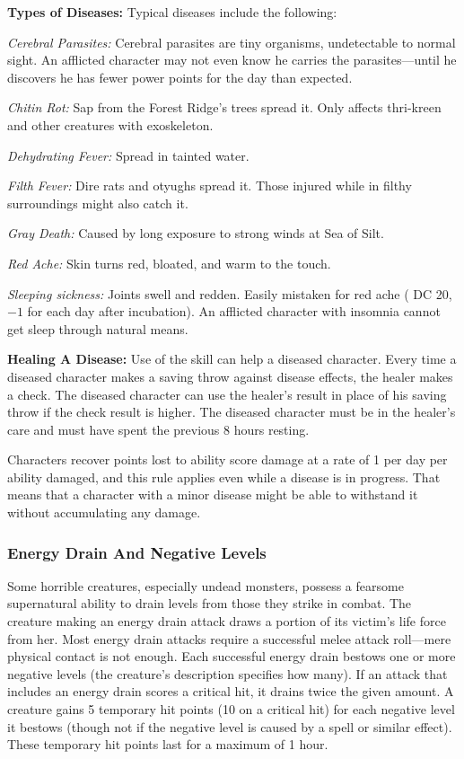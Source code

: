 \textbf{Types of Diseases:} Typical diseases include the following:

\textit{Cerebral Parasites:} Cerebral parasites are tiny organisms, undetectable to normal sight. An afflicted character may not even know he carries the parasites---until he discovers he has fewer power points for the day than expected. 

\textit{Chitin Rot:} Sap from the Forest Ridge's trees spread it. Only affects thri-kreen and other creatures with exoskeleton.

\textit{Dehydrating Fever:} Spread in tainted water.

\textit{Filth Fever:} Dire rats and otyughs spread it. Those injured while in filthy surroundings might also catch it.

\textit{Gray Death:} Caused by long exposure to strong winds at Sea of Silt.

\textit{Red Ache:} Skin turns red, bloated, and warm to the touch.

\textit{Sleeping sickness:} Joints swell and redden. Easily mistaken for red ache ( DC 20, $-1$ for each day after incubation). An afflicted character with insomnia cannot get sleep through natural means.

\textbf{Healing A Disease:} Use of the  skill can help a diseased character. Every time a diseased character makes a saving throw against disease effects, the healer makes a check. The diseased character can use the healer's result in place of his saving throw if the  check result is higher. The diseased character must be in the healer's care and must have spent the previous 8 hours resting.

Characters recover points lost to ability score damage at a rate of 1 per day per ability damaged, and this rule applies even while a disease is in progress. That means that a character with a minor disease might be able to withstand it without accumulating any damage.

\subsubsection{Energy Drain And Negative Levels}
Some horrible creatures, especially undead monsters, possess a fearsome supernatural ability to drain levels from those they strike in combat. The creature making an energy drain attack draws a portion of its victim's life force from her. Most energy drain attacks require a successful melee attack roll---mere physical contact is not enough. Each successful energy drain bestows one or more negative levels (the creature's description specifies how many). If an attack that includes an energy drain scores a critical hit, it drains twice the given amount. A creature gains 5 temporary hit points (10 on a critical hit) for each negative level it bestows (though not if the negative level is caused by a spell or similar effect). These temporary hit points last for a maximum of 1 hour.

